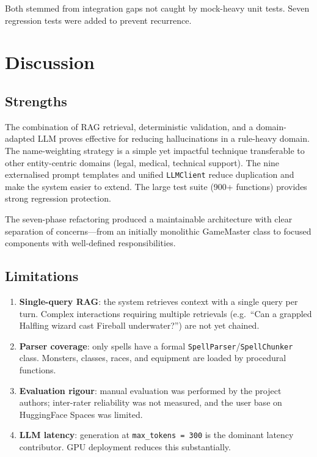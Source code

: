 \documentclass[12pt,a4paper]{article}
\begin{document}
Both stemmed from integration gaps not caught by mock-heavy unit tests.
Seven regression tests were added to prevent recurrence.

\section{Discussion}
\label{sec:discussion}

\subsection{Strengths}

The combination of RAG retrieval, deterministic validation, and a
domain-adapted LLM proves effective for reducing hallucinations in a
rule-heavy domain. The name-weighting strategy is a simple yet impactful
technique transferable to other entity-centric domains (legal, medical,
technical support). The nine externalised prompt templates and unified
\texttt{LLMClient} reduce duplication and make the system easier to extend.
The large test suite (900+ functions) provides strong regression protection.

The seven-phase refactoring produced a maintainable architecture with clear
separation of concerns---from an initially monolithic GameMaster class to
focused components with well-defined responsibilities.

\subsection{Limitations}

\begin{enumerate}[noitemsep]
    \item \textbf{Single-query RAG}: the system retrieves context with a
          single query per turn. Complex interactions requiring multiple
          retrievals (e.g.\ ``Can a grappled Halfling wizard cast Fireball
          underwater?'') are not yet chained.
    \item \textbf{Parser coverage}: only spells have a formal
          \texttt{SpellParser}/\texttt{SpellChunker} class. Monsters,
          classes, races, and equipment are loaded by procedural functions.
    \item \textbf{Evaluation rigour}: manual evaluation was performed by the
          project authors; inter-rater reliability was not measured, and the
          user base on HuggingFace Spaces was limited.
    \item \textbf{LLM latency}: generation at
          \texttt{max\_tokens\,=\,300} is the dominant latency contributor.
          GPU deployment reduces this substantially.
\end{enumerate}
\end{document}
